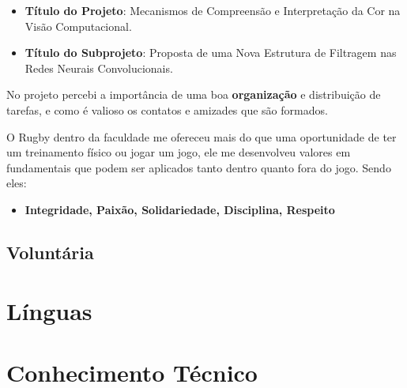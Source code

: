 \documentclass[10pt, a4paper, roman]{moderncv} %
\begin{document}
\vspace{0.2cm}
{
	\begin{itemize}
		\item \textbf{Título do Projeto}: Mecanismos de Compreensão e Interpretação da Cor na Visão Computacional.
		\item \textbf{Título do Subprojeto}: Proposta de uma Nova Estrutura de Filtragem nas Redes Neurais Convolucionais.
	\end{itemize}
  No projeto percebi a importância de uma boa \textbf{organização} e distribuição de tarefas, e como é valioso os contatos e amizades que são formados.
}


\vspace{0.2cm}
{
O Rugby dentro da faculdade me ofereceu mais do que uma oportunidade de ter um treinamento físico ou jogar um jogo, ele me desenvolveu valores em fundamentais que podem ser aplicados tanto dentro quanto fora do jogo. Sendo eles:
\begin{itemize}
  \item \textbf{Integridade, Paixão, Solidariedade, Disciplina, Respeito}
\end{itemize}
}


\vspace{0.5cm}
\subsection{Voluntária}

\vspace{0.2cm}


\vspace{0.5cm}
\section{Línguas}

\vspace{0.2cm}

\vspace{0.5cm}
\section{Conhecimento Técnico}

\end{document}
